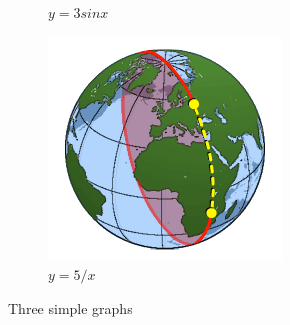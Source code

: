 \documentclass[12pt,letterpaper,oneside]{article}
\begin{document}
\begin{figure}
\begin{subfigure}[b]{0.3\textwidth}
         \caption{$y=3sinx$}
         \label{fig:three sin x}
     \end{subfigure}
     \hfill
     \begin{subfigure}[b]{0.3\textwidth}
         \centering
         \includegraphics[width=\textwidth]{haversine.png}
         \caption{$y=5/x$}
         \label{fig:five over x}
     \end{subfigure}
        \caption{Three simple graphs}
        \label{fig:three graphs}
\end{figure}
\end{document}
